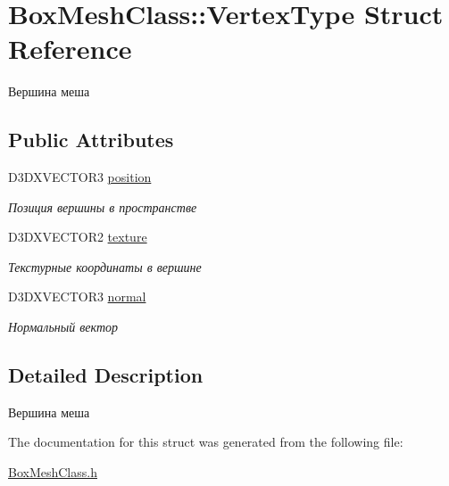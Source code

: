 \hypertarget{struct_box_mesh_class_1_1_vertex_type}{}\section{Box\+Mesh\+Class\+:\+:Vertex\+Type Struct Reference}
\label{struct_box_mesh_class_1_1_vertex_type}


Вершина меша  


\subsection*{Public Attributes}
\begin{DoxyCompactItemize}
\item 
D3\+D\+X\+V\+E\+C\+T\+O\+R3 \hyperlink{group___meshes_ga9114f633b9e9db265ce4a7f7eabef52f}{position}
\begin{DoxyCompactList}\small\item\em Позиция вершины в пространстве \end{DoxyCompactList}\item 
D3\+D\+X\+V\+E\+C\+T\+O\+R2 \hyperlink{group___meshes_gaf2dc401f064ea81b937be217a0effc85}{texture}
\begin{DoxyCompactList}\small\item\em Текстурные координаты в вершине \end{DoxyCompactList}\item 
D3\+D\+X\+V\+E\+C\+T\+O\+R3 \hyperlink{group___meshes_gae3644ce0f78b169c69ea857463b35c90}{normal}
\begin{DoxyCompactList}\small\item\em Нормальный вектор \end{DoxyCompactList}\end{DoxyCompactItemize}


\subsection{Detailed Description}
Вершина меша 

The documentation for this struct was generated from the following file\+:\begin{DoxyCompactItemize}
\item 
\hyperlink{_box_mesh_class_8h}{Box\+Mesh\+Class.\+h}\end{DoxyCompactItemize}
